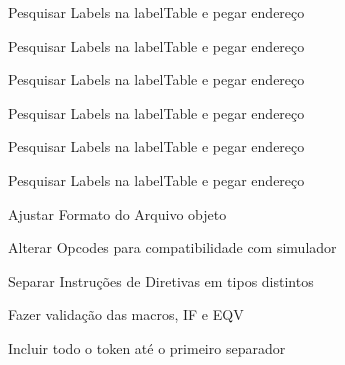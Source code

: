 
\begin{DoxyRefList}
\item[\label{todo__todo000001}%
\hypertarget{todo__todo000001}{}%
Membro \hyperlink{assembler_8h_a368a4f7b83093ab74e79be4ceeb11e3d}{assembler} (int argc, char $\ast$argv\mbox{[}\mbox{]})]Pesquisar Labels na label\-Table e pegar endereço 

Pesquisar Labels na label\-Table e pegar endereço 

Pesquisar Labels na label\-Table e pegar endereço 

Pesquisar Labels na label\-Table e pegar endereço 

Pesquisar Labels na label\-Table e pegar endereço 

Pesquisar Labels na label\-Table e pegar endereço 

Ajustar Formato do Arquivo objeto  
\item[\label{todo__todo000008}%
\hypertarget{todo__todo000008}{}%
Membro \hyperlink{languagedefinition_8h_a1830ff5737e4f1610e975ee2aa489206}{Instruction\-Code} ]Alterar Opcodes para compatibilidade com simulador 

Separar Instruções de Diretivas em tipos distintos  
\item[\label{todo__todo000010}%
\hypertarget{todo__todo000010}{}%
Membro \hyperlink{macroeval_8h_ab726e2a9f26698bddb5ddd13683e6630}{macroeval} (int argc, char $\ast$$\ast$argv)]Fazer validação das macros, I\-F e E\-Q\-V  
\item[\label{todo__todo000009}%
\hypertarget{todo__todo000009}{}%
Membro \hyperlink{lexer_8h_a63ef6d488951c4541159fe0961565c4d}{scanner} (std\-::string line, int $\ast$position)]Incluir todo o token até o primeiro separador 
\end{DoxyRefList}